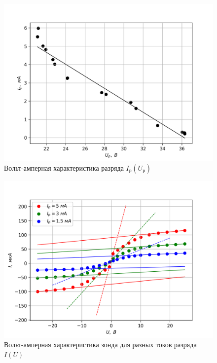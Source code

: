 \documentclass[14pt, a4paper]{report}
\begin{document}
\begin{figure}[h]
\centering
\includegraphics[scale=0.6]{images/351_1.png}
\caption{Вольт-амперная характеристика разряда $I_р(U_р)$}
\end{figure}

\begin{figure}[h]
\centering
\includegraphics[scale=0.6]{images/351_2.png}
\caption{Вольт-амперная характеристика зонда для разных токов разряда $I(U)$}
\end{figure}
\end{document}
